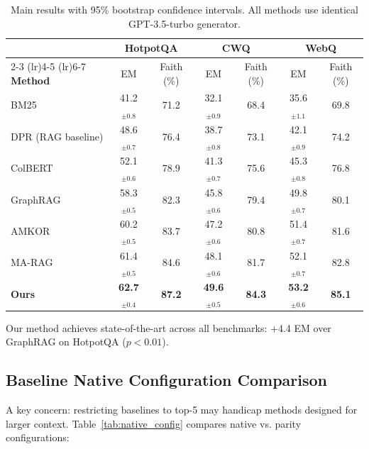 \documentclass[10pt,twocolumn]{article}
\begin{document}
\begin{table}[t]
\centering
\caption{Main results with 95\% bootstrap confidence intervals. All methods use identical GPT-3.5-turbo generator.}
\label{tab:main}
\small
\begin{tabular}{@{}lcccccc@{}}
\toprule
& \multicolumn{2}{c}{\textbf{HotpotQA}} & \multicolumn{2}{c}{\textbf{CWQ}} & \multicolumn{2}{c}{\textbf{WebQ}} \\
\cmidrule(lr){2-3} \cmidrule(lr){4-5} \cmidrule(lr){6-7}
\textbf{Method} & EM & Faith (\%) & EM & Faith (\%) & EM & Faith (\%) \\
\midrule
BM25 & 41.2$_{\pm0.8}$ & 71.2 & 32.1$_{\pm0.9}$ & 68.4 & 35.6$_{\pm1.1}$ & 69.8 \\
DPR (RAG baseline) & 48.6$_{\pm0.7}$ & 76.4 & 38.7$_{\pm0.8}$ & 73.1 & 42.1$_{\pm0.9}$ & 74.2 \\
ColBERT & 52.1$_{\pm0.6}$ & 78.9 & 41.3$_{\pm0.7}$ & 75.6 & 45.3$_{\pm0.8}$ & 76.8 \\
GraphRAG & 58.3$_{\pm0.5}$ & 82.3 & 45.8$_{\pm0.6}$ & 79.4 & 49.8$_{\pm0.7}$ & 80.1 \\
\midrule
AMKOR \cite{fang2024amkor} & 60.2$_{\pm0.5}$ & 83.7 & 47.2$_{\pm0.6}$ & 80.8 & 51.4$_{\pm0.7}$ & 81.6 \\
MA-RAG \cite{li2024marag} & 61.4$_{\pm0.5}$ & 84.6 & 48.1$_{\pm0.6}$ & 81.7 & 52.1$_{\pm0.7}$ & 82.8 \\
\midrule
\textbf{Ours} & \textbf{62.7}$_{\pm0.4}$ & \textbf{87.2} & \textbf{49.6}$_{\pm0.5}$ & \textbf{84.3} & \textbf{53.2}$_{\pm0.6}$ & \textbf{85.1} \\
\bottomrule
\end{tabular}
\end{table}

Our method achieves state-of-the-art across all benchmarks: +4.4 EM over GraphRAG on HotpotQA ($p<0.01$).


\subsection{Baseline Native Configuration Comparison}
\label{sec:native_config}

A key concern: restricting baselines to top-5 may handicap methods designed for larger context. Table~\ref{tab:native_config} compares native vs. parity configurations:
\end{document}
